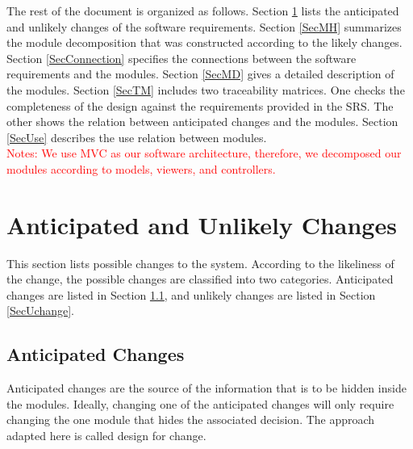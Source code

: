 \documentclass[12pt, titlepage]{article}
\begin{document}
\noindent The rest of the document is organized as follows. Section
\ref{SecChange} lists the anticipated and unlikely changes of the software
requirements. Section \ref{SecMH} summarizes the module decomposition that
was constructed according to the likely changes. Section \ref{SecConnection}
specifies the connections between the software requirements and the
modules. Section \ref{SecMD} gives a detailed description of the
modules. Section \ref{SecTM} includes two traceability matrices. One checks
the completeness of the design against the requirements provided in the SRS. The
other shows the relation between anticipated changes and the modules. Section
\ref{SecUse} describes the use relation between modules.\\

\noindent \textcolor{red}{Notes: We use MVC as our software architecture, therefore, we 
decomposed our modules according to models, viewers, and controllers.}

\section{Anticipated and Unlikely Changes} \label{SecChange}

This section lists possible changes to the system. According to the likeliness
of the change, the possible changes are classified into two
categories. Anticipated changes are listed in Section \ref{SecAchange}, and
unlikely changes are listed in Section \ref{SecUchange}.

\subsection{Anticipated Changes} \label{SecAchange}

Anticipated changes are the source of the information that is to be hidden
inside the modules. Ideally, changing one of the anticipated changes will only
require changing the one module that hides the associated decision. The approach
adapted here is called design for
change.
\end{document}
